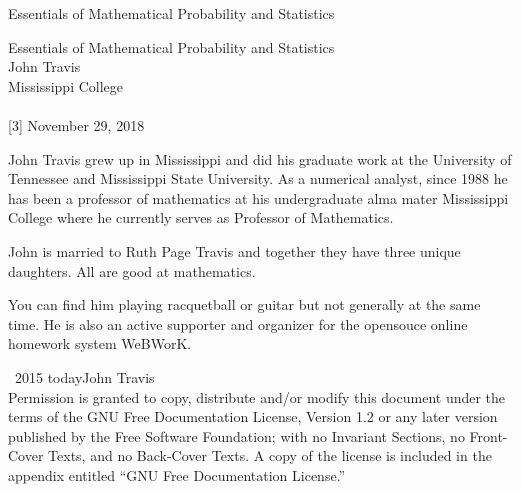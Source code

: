 \documentclass[10pt,]{book}
\numberwithin{equation}{section}
\begin{document}
\frontmatter
\thispagestyle{empty}
{\centering
\vspace*{0.28\textheight}
{\Huge Essentials of Mathematical Probability and Statistics}\\}
\clearpage
\thispagestyle{empty}
\null%
\clearpage
\thispagestyle{empty}
{\centering
\vspace*{0.14\textheight}
{\Huge Essentials of Mathematical Probability and Statistics}\\[3\baselineskip]
{\Large John Travis}\\[0.5\baselineskip]
{\Large Mississippi College}\\[3\baselineskip]
{\Large }\\[0.5\baselineskip]
[3\baselineskip]
{\Large November 29, 2018}\\}
\clearpage
\thispagestyle{empty}
\hypertarget{colophon-1}{}\noindent
\hypertarget{p-1}{}%
John Travis grew up in Mississippi and did his graduate work at the University of Tennessee and Mississippi State University. As a numerical analyst, since 1988 he has been a professor of mathematics at his undergraduate alma mater Mississippi College where he currently serves as Professor of Mathematics.%
\par
\hypertarget{p-2}{}%
John is married to Ruth Page Travis and together they have three unique daughters.  All are good at mathematics.%
\par
\hypertarget{p-3}{}%
You can find him playing racquetball or guitar but not generally at the same time. He is also an active supporter and organizer for the opensouce online homework system WeBWorK.%
\par
{}
\noindent\textcopyright\ 2015 \textendash{}today\quad{}John Travis\\[0.5\baselineskip]
Permission is granted to copy, distribute and/or modify this document under the terms of the GNU Free Documentation License, Version 1.2 or any later version published by the Free Software Foundation; with no Invariant Sections, no Front-Cover Texts, and no Back-Cover Texts.  A copy of the license is included in the appendix entitled ``GNU Free Documentation License.''\par\medskip
{}
\null\clearpage
\end{document}
